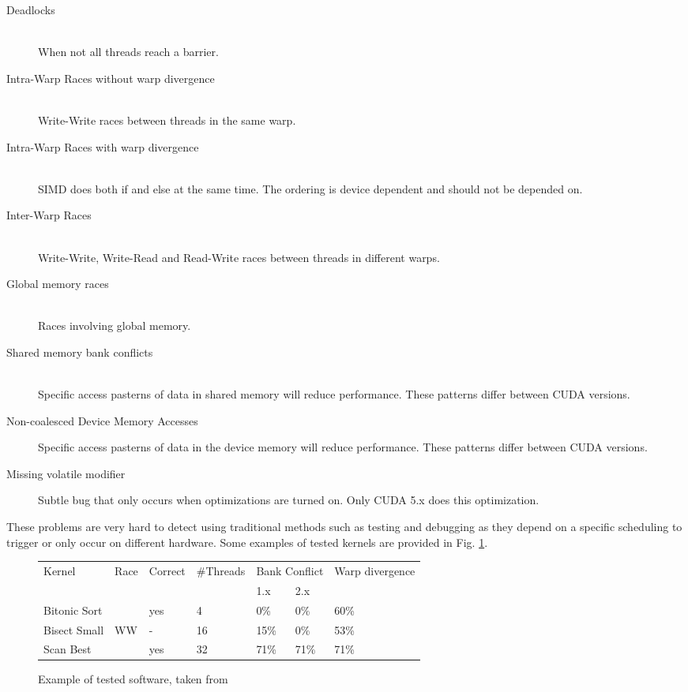 \documentclass[10pt]{llncs}
\begin{document}
\begin{description}
	\item[Deadlocks] \hfill \\
		When not all threads reach a barrier.
	\item[Intra-Warp Races without warp divergence]  \hfill \\
		Write-Write races between threads in the same warp.
	\item[Intra-Warp Races with warp divergence] \hfill \\
		SIMD does both if and else at the same time. The ordering is device dependent and should not be depended on.
	\item[Inter-Warp Races] \hfill \\
		Write-Write, Write-Read and Read-Write races between threads in different warps.
	\item[Global memory races] \hfill \\
		Races involving global memory.
	\item[Shared memory bank conflicts] \hfill \\
		Specific access pasterns of data in shared memory will reduce performance. These patterns differ between CUDA versions.
	\item[Non-coalesced Device Memory Accesses]
		Specific access pasterns of data in the device memory will reduce performance. These patterns differ between CUDA versions.
	\item[Missing volatile modifier]
		Subtle bug that only occurs when optimizations are turned on. Only CUDA 5.x does this optimization.
\end{description}

These problems are very hard to detect using traditional methods such as testing and debugging as they depend on a specific scheduling to trigger or only occur on different hardware. Some examples of tested kernels are provided in Fig. \ref{example:7}.

\begin{figure}
	\centering
	
	\begin{tabular}{l l l l l l l}
		Kernel & Race & Correct & \#Threads & \multicolumn{2}{c}{Bank Conflict} & Warp divergence\\
		& & & & 1.x & 2.x & \\
		\hline
		
		Bitonic Sort & & yes & 4 & 0\% & 0\% & 60\% \\
		Bisect Small & WW & - & 16 & 15\% & 0\% & 53\% \\
		Scan Best & & yes & 32 & 71\% & 71\% & 71\%
	\end{tabular}
	
	\caption{Example of tested software, taken from \cite{base7}}
	\label{example:7}
\end{figure}
\end{document}

